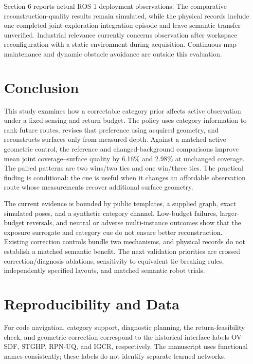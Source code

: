 \documentclass[11pt,a4paper]{article}
\providecommand{\hypertarget}[2]{#2}
\begin{document}
Section 6 reports actual ROS 1 deployment observations. The comparative reconstruction-quality results remain simulated, while the physical records include one completed joint-exploration integration episode and leave semantic transfer unverified. Industrial relevance currently concerns observation after workspace reconfiguration with a static environment during acquisition. Continuous map maintenance and dynamic obstacle avoidance are outside this evaluation.

\hypertarget{conclusion}{%
\section{Conclusion}\label{conclusion}}

This study examines how a correctable category prior affects active observation under a fixed sensing and return budget. The policy uses category information to rank future routes, revises that preference using acquired geometry, and reconstructs surfaces only from measured depth. Against a matched active geometric control, the reference and changed-background comparisons improve mean joint coverage--surface quality by 6.16\% and 2.98\% at unchanged coverage. The paired patterns are two wins/two ties and one win/three ties. The practical finding is conditional: the cue is useful when it changes an affordable observation route whose measurements recover additional surface geometry.

The current evidence is bounded by public templates, a supplied graph, exact simulated poses, and a synthetic category channel. Low-budget failures, larger-budget reversals, and neutral or adverse multi-instance outcomes show that the exposure surrogate and category cue do not ensure better reconstruction. Existing correction controls bundle two mechanisms, and physical records do not establish a matched semantic benefit. The next validation priorities are crossed correction/diagnosis ablations, sensitivity to equivalent tie-breaking rules, independently specified layouts, and matched semantic robot trials.

\hypertarget{reproducibility-and-data}{%
\section{Reproducibility and Data}\label{reproducibility-and-data}}

For code navigation, category support, diagnostic planning, the return-feasibility check, and geometric correction correspond to the historical interface labels OV-SDF, STGHP, RPN-UQ, and IGCR, respectively. The manuscript uses functional names consistently; these labels do not identify separate learned networks.
\end{document}
